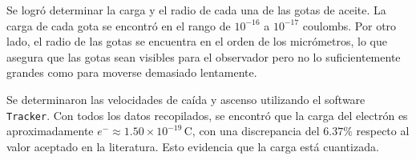 Se logró determinar la carga y el radio de cada una de las gotas de aceite. La carga de cada gota se encontró en el rango de $10^{-16}$ a $10^{-17}$ coulombs. Por otro lado, el radio de las gotas se encuentra en el orden de los micrómetros, lo que asegura que las gotas sean visibles para el observador pero no lo suficientemente grandes como para moverse demasiado lentamente.

Se determinaron las velocidades de caída y ascenso utilizando el software \texttt{Tracker}. Con todos los datos recopilados, se encontró que la carga del electrón es aproximadamente $e^- \approx 1.50 \times 10^{-19} \, \text{C}$, con una discrepancia del $6.37\%$ respecto al valor aceptado en la literatura. Esto evidencia que la carga está cuantizada.

